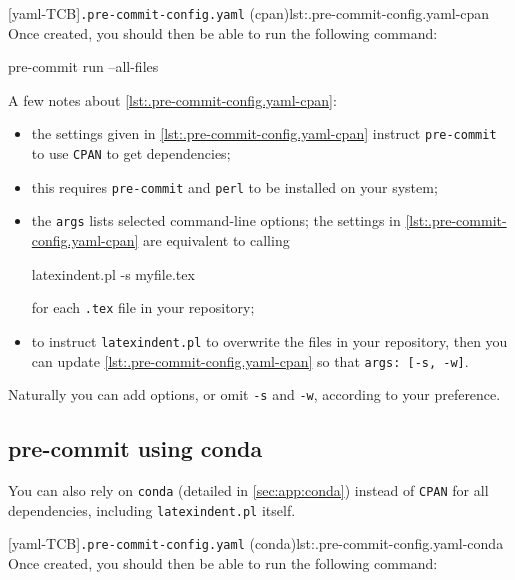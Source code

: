   [yaml-TCB]{\texttt{.pre-commit-config.yaml} (cpan)}{lst:.pre-commit-config.yaml-cpan}
  Once created, you should then be able to run the following command:

  \begin{commandshell}
pre-commit run --all-files
\end{commandshell}

  A few notes about \cref{lst:.pre-commit-config.yaml-cpan}:
  \begin{itemize}
   \item the settings given in \cref{lst:.pre-commit-config.yaml-cpan} instruct
         \texttt{pre-commit} to use \texttt{CPAN} to get dependencies;
   \item this requires \texttt{pre-commit} and \texttt{perl} to be installed on your
         system;
   \item the \texttt{args} lists selected command-line options; the settings in
         \cref{lst:.pre-commit-config.yaml-cpan} are equivalent to calling

         \begin{commandshell}
latexindent.pl -s myfile.tex
\end{commandshell}

         for each \texttt{.tex} file in your repository;
   \item to instruct \texttt{latexindent.pl} to overwrite the files in your repository,
         then you can update \cref{lst:.pre-commit-config.yaml-cpan} so that
         \texttt{args: [-s, -w]}.
  \end{itemize}

  Naturally you can add options, or omit \texttt{-s} and \texttt{-w}, according to your
  preference.

 \subsection{pre-commit using conda}\label{sec:pre-commit-conda}

  You can also rely on \texttt{conda} (detailed in \cref{sec:app:conda}) instead of
  \texttt{CPAN} for all dependencies, including \texttt{latexindent.pl} itself.
    

  [yaml-TCB]{\texttt{.pre-commit-config.yaml} (conda)}{lst:.pre-commit-config.yaml-conda}
  Once created, you should then be able to run the following command:


